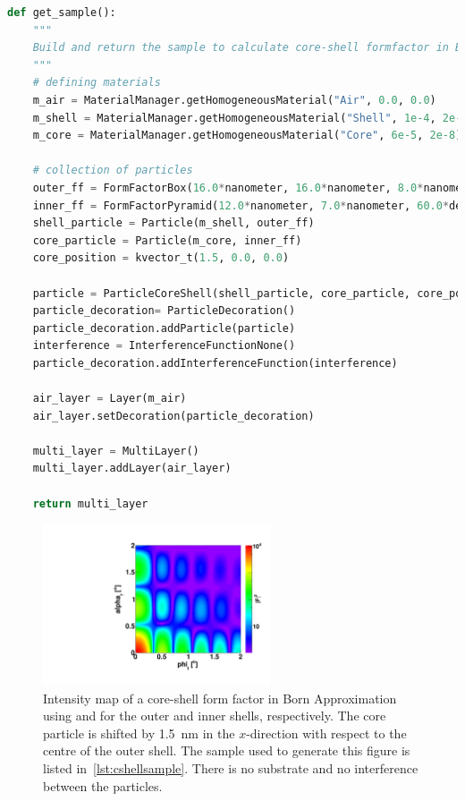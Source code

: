 \begin{lstlisting}[language=python,
  style=eclipseboxed,numbers=none,nolol,caption={\Code{Python} script
    to create a core-shell particle made of a box with a pyramidal shifted inset.},label={lst:cshellsample}]
def get_sample():
    """
    Build and return the sample to calculate core-shell formfactor in Born Approximation.
    """
    # defining materials 
    m_air = MaterialManager.getHomogeneousMaterial("Air", 0.0, 0.0)
    m_shell = MaterialManager.getHomogeneousMaterial("Shell", 1e-4, 2e-8)
    m_core = MaterialManager.getHomogeneousMaterial("Core", 6e-5, 2e-8)

    # collection of particles
    outer_ff = FormFactorBox(16.0*nanometer, 16.0*nanometer, 8.0*nanometer) 
    inner_ff = FormFactorPyramid(12.0*nanometer, 7.0*nanometer, 60.0*degree)
    shell_particle = Particle(m_shell, outer_ff)
    core_particle = Particle(m_core, inner_ff)
    core_position = kvector_t(1.5, 0.0, 0.0)

    particle = ParticleCoreShell(shell_particle, core_particle, core_position)
    particle_decoration= ParticleDecoration()
    particle_decoration.addParticle(particle)
    interference = InterferenceFunctionNone()
    particle_decoration.addInterferenceFunction(interference)

    air_layer = Layer(m_air)
    air_layer.setDecoration(particle_decoration)

    multi_layer = MultiLayer()
    multi_layer.addLayer(air_layer)

    return multi_layer
\end{lstlisting}

\begin{figure}[h]
\begin{center}
\includegraphics[width=0.6\textwidth]{Figures/CoreShellParallPyr}
\end{center}
\caption{Intensity map of a core-shell form factor in Born Approximation using   and  for the outer and inner shells, respectively. The core particle is shifted by 1.5~nm in the $x$-direction with respect to the centre of the outer shell. The sample used to generate this figure is listed in~\ref{lst:cshellsample}.  There is no substrate and no interference between the particles.}
\label{fig:FFCoreShellBA}
\end{figure}


